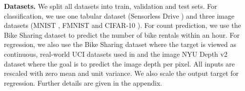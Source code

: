 
\textbf{Datasets.} We split all datasets into train, validation and test sets. For classification, we use one tabular dataset (Sensorless Drive \citep{uci}) and three image datasets (MNIST \citep{mnist}, FMNIST \citep{fashion-mnist} and CIFAR-10 \citep{cifar10}). For count prediction, we use the Bike Sharing dataset \citep{bike-sharing} to predict the number of bike rentals within an hour. For regression, we also use the Bike Sharing dataset where the target is viewed as continuous, real-world UCI datasets used in \citet{evidential-regression, probabilistic-backprop-scalable-bnn} and the image NYU Depth v2 dataset \citep{nyu-depth} where the goal is to predict the image depth per pixel. All inputs are rescaled with zero mean and unit variance. We also scale the output target for regression. Further details are given in the appendix.

